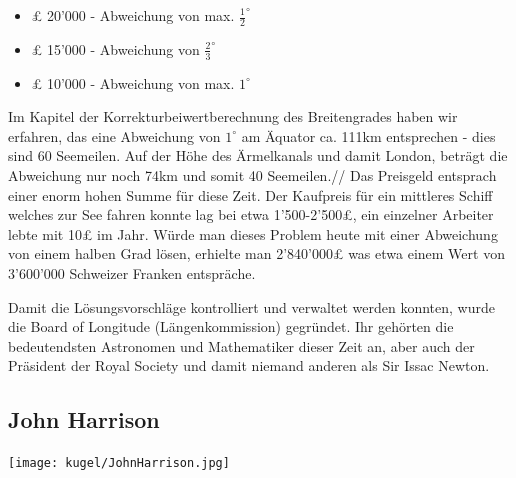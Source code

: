 \begin{refsection}
\begin{itemize}
\item £ 20’000 - Abweichung von max. $\frac{1}{2}^{\circ}$
\item £ 15’000 - Abweichung von $\frac{2}{3}^{\circ}$
\item £ 10’000 - Abweichung von max. $1 ^{\circ}$
\end{itemize}

Im Kapitel der Korrekturbeiwertberechnung des Breitengrades haben wir erfahren, das eine Abweichung von $1 ^{\circ}$ am Äquator ca. 111km entsprechen - dies sind 60 Seemeilen.
Auf der Höhe des Ärmelkanals und damit London, beträgt die Abweichung nur noch 74km und somit 40 Seemeilen.//
Das Preisgeld entsprach einer enorm hohen Summe für diese Zeit. Der Kaufpreis für ein mittleres Schiff welches zur See fahren konnte lag bei etwa 1’500-2’500£, ein einzelner Arbeiter lebte mit 10£ im Jahr.
Würde man dieses Problem heute mit einer Abweichung von einem halben Grad lösen, erhielte man 2’840’000£ was etwa einem Wert von 3’600’000 Schweizer Franken entspräche. 

Damit die Lösungsvorschläge kontrolliert und verwaltet werden konnten, wurde die Board of Longitude (Längenkommission) gegründet. Ihr gehörten die bedeutendsten Astronomen und Mathematiker dieser Zeit an, aber auch der Präsident der Royal Society und damit niemand anderen als Sir Issac Newton.

\subsection{John Harrison}

\begin{center}
        \texttt{[image: kugel/JohnHarrison.jpg]}
\end{center}


\end{refsection}
